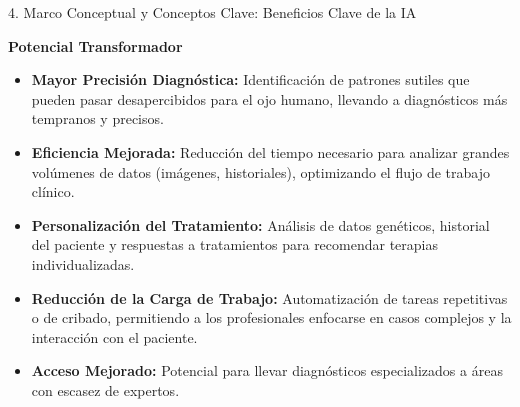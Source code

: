 \documentclass[aspectratio=169]{beamer}
\begin{document}
\begin{frame}[fragile]{4. Marco Conceptual y Conceptos Clave: Beneficios Clave de la IA}


\textbf{Potencial Transformador}
\begin{itemize}
  \item \textbf{Mayor Precisión Diagnóstica:} Identificación de patrones sutiles que pueden pasar desapercibidos para el ojo humano, llevando a diagnósticos más tempranos y precisos.
  \item \textbf{Eficiencia Mejorada:} Reducción del tiempo necesario para analizar grandes volúmenes de datos (imágenes, historiales), optimizando el flujo de trabajo clínico.
  \item \textbf{Personalización del Tratamiento:} Análisis de datos genéticos, historial del paciente y respuestas a tratamientos para recomendar terapias individualizadas.
  \item \textbf{Reducción de la Carga de Trabajo:} Automatización de tareas repetitivas o de cribado, permitiendo a los profesionales enfocarse en casos complejos y la interacción con el paciente.
  \item \textbf{Acceso Mejorado:} Potencial para llevar diagnósticos especializados a áreas con escasez de expertos.
\end{itemize}
\end{frame}
\end{document}
